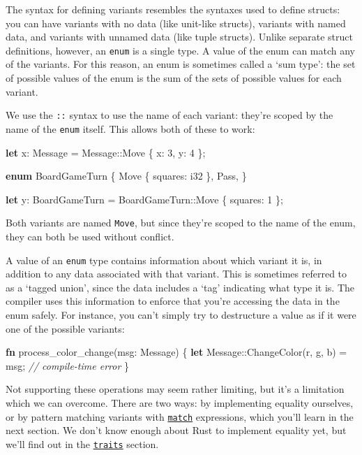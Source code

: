 \documentclass[a4paper,]{book}
\newenvironment{Shaded}{\begin{snugshade}}{\end{snugshade}}
\newcommand{\KeywordTok}[1]{\textcolor[rgb]{0.13,0.29,0.53}{\textbf{{#1}}}}
\newcommand{\DataTypeTok}[1]{\textcolor[rgb]{0.13,0.29,0.53}{{#1}}}
\newcommand{\DecValTok}[1]{\textcolor[rgb]{0.00,0.00,0.81}{{#1}}}
\newcommand{\CommentTok}[1]{\textcolor[rgb]{0.56,0.35,0.01}{\textit{{#1}}}}
\newcommand{\NormalTok}[1]{{#1}}
\begin{document}
The syntax for defining variants resembles the syntaxes used to define
structs: you can have variants with no data (like unit-like structs),
variants with named data, and variants with unnamed data (like tuple
structs). Unlike separate struct definitions, however, an \texttt{enum}
is a single type. A value of the enum can match any of the variants. For
this reason, an enum is sometimes called a `sum type': the set of
possible values of the enum is the sum of the sets of possible values
for each variant.

We use the \texttt{::} syntax to use the name of each variant: they're
scoped by the name of the \texttt{enum} itself. This allows both of
these to work:

\begin{Shaded}
\begin{Highlighting}[]
\KeywordTok{let} \NormalTok{x: Message = Message::Move \{ x: }\DecValTok{3}\NormalTok{, y: }\DecValTok{4} \NormalTok{\};}

\KeywordTok{enum} \NormalTok{BoardGameTurn \{}
    \NormalTok{Move \{ squares: }\DataTypeTok{i32} \NormalTok{\},}
    \NormalTok{Pass,}
\NormalTok{\}}

\KeywordTok{let} \NormalTok{y: BoardGameTurn = BoardGameTurn::Move \{ squares: }\DecValTok{1} \NormalTok{\};}
\end{Highlighting}
\end{Shaded}

Both variants are named \texttt{Move}, but since they're scoped to the
name of the enum, they can both be used without conflict.

A value of an \texttt{enum} type contains information about which
variant it is, in addition to any data associated with that variant.
This is sometimes referred to as a `tagged union', since the data
includes a `tag' indicating what type it is. The compiler uses this
information to enforce that you're accessing the data in the enum
safely. For instance, you can't simply try to destructure a value as if
it were one of the possible variants:

\begin{Shaded}
\begin{Highlighting}[]
\KeywordTok{fn} \NormalTok{process_color_change(msg: Message) \{}
    \KeywordTok{let} \NormalTok{Message::ChangeColor(r, g, b) = msg; }\CommentTok{// compile-time error}
\NormalTok{\}}
\end{Highlighting}
\end{Shaded}

Not supporting these operations may seem rather limiting, but it's a
limitation which we can overcome. There are two ways: by implementing
equality ourselves, or by pattern matching variants with
\protect\hyperlink{sec--match}{\texttt{match}} expressions, which you'll
learn in the next section. We don't know enough about Rust to implement
equality yet, but we'll find out in the
\protect\hyperlink{sec--traits}{\texttt{traits}} section.
\end{document}
